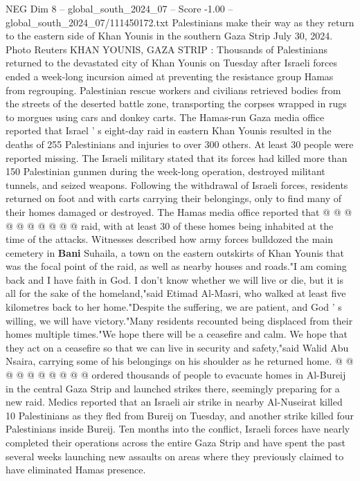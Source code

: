 \begin{textsample}{NEG Dim 8 – global\_south\_2024\_07 – Score -1.00 – global\_south\_2024\_07/111450172.txt}  \label{ex:f8_neg_356}
Palestinians make their way as they return to the eastern side of Khan Younis in the southern Gaza Strip July 30, 2024.
Photo Reuters KHAN YOUNIS, GAZA STRIP : Thousands of Palestinians returned to the devastated city of Khan Younis on Tuesday after Israeli forces ended a week-long incursion aimed at preventing the resistance group Hamas from regrouping.
Palestinian rescue workers and civilians retrieved bodies from the streets of the deserted battle zone, transporting the corpses wrapped in rugs to morgues using cars and donkey carts.
The Hamas-run Gaza media office reported that Israel ' s eight-day raid in eastern Khan Younis resulted in the deaths of 255 Palestinians and injuries to over 300 others.
At least 30 people were reported missing.
The Israeli military stated that its forces had killed more than 150 Palestinian gunmen during the week-long operation, destroyed militant tunnels, and seized weapons.
Following the withdrawal of Israeli forces, residents returned on foot and with carts carrying their belongings, only to find many of their homes damaged or destroyed.
The Hamas media office reported that @ @ @ @ @ @ @ @ @ @ raid, with at least 30 of these homes being inhabited at the time of the attacks.
Witnesses described how army forces bulldozed the main cemetery in \textbf{Bani} Suhaila, a town on the eastern outskirts of Khan Younis that was the focal point of the raid, as well as nearby houses and roads."I am coming back and I have faith in God.
I don't know whether we will live or die, but it is all for the sake of the homeland,"said Etimad Al-Masri, who walked at least five kilometres back to her home."Despite the suffering, we are patient, and God ' s willing, we will have victory."Many residents recounted being displaced from their homes multiple times."We hope there will be a ceasefire and calm.
We hope that they act on a ceasefire so that we can live in security and safety,"said Walid Abu Nsaira, carrying some of his belongings on his shoulder as he returned home. @ @ @ @ @ @ @ @ @ @ ordered thousands of people to evacuate homes in Al-Bureij in the central Gaza Strip and launched strikes there, seemingly preparing for a new raid.
Medics reported that an Israeli air strike in nearby Al-Nuseirat killed 10 Palestinians as they fled from Bureij on Tuesday, and another strike killed four Palestinians inside Bureij.
Ten months into the conflict, Israeli forces have nearly completed their operations across the entire Gaza Strip and have spent the past several weeks launching new assaults on areas where they previously claimed to have eliminated Hamas presence.

\end{textsample}
